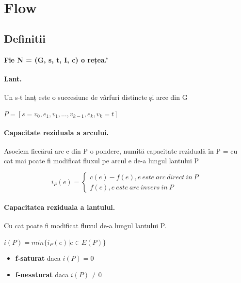 \documentclass{article}
\begin{document}
\section{Flow}
\subsection*{Definitii}
\paragraph*{Fie N = (G, {s}, {t}, I, c) o rețea.'}
\paragraph*{Lant.} Un s-t lanț este o succesiune de vârfuri distincte și arce din G
\begin{center}
    $P = [ s=v_0, e_1, v_1, …, v_{k-1}, e_k, v_k=t ]$
\end{center}
\paragraph*{Capacitate reziduala a arcului.} Asociem fiecărui arc e din P o pondere, numită capacitate reziduală în P = cu cat mai poate fi modificat fluxul pe arcul e de-a lungul lantului P
\begin{center}
    \[ 
    i_P(e) = \left\{
    \begin{array}{ll}
            c(e) - f(e), e \ este \ arc \ direct \ in \ P \\ 
            f(e), e \ este \ arc \ invers \ in \ P
    \end{array} 
    \right. 
    \]
\end{center}

\paragraph*{Capacitatea reziduala a lantului.} Cu cat poate fi modificat fluxul de-a lungul lantului P.
\begin{center}
    $i(P) = min \{i_P(e) | e \in E(P)\}$
\end{center}
\begin{itemize}
    \item \textbf{f-saturat} daca $i(P)=0$
    \item \textbf{f-nesaturat} daca $i(P) \neq 0$
\end{itemize}
\end{document}
